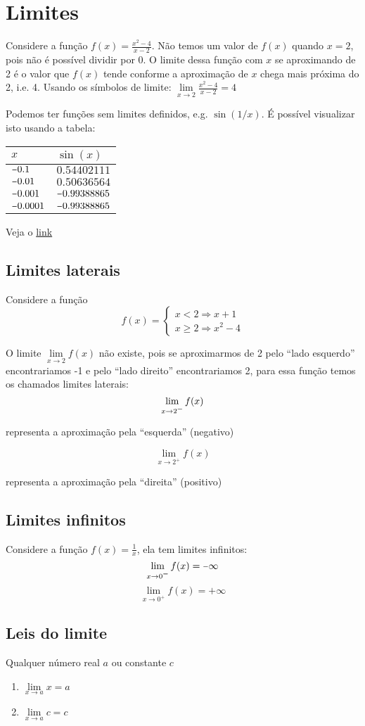 \documentclass[12pt,a4paper]{article}
\newcommand{\minus}{\scalebox{0.75}[1.0]{$-$}}
\begin{document}
\section*{Limites}
Considere a função $f(x) = \frac{x^2 - 4}{x-2}$.
Não temos um valor de $f(x)$ quando $x=2$, pois não é possível dividir por 0.
O limite dessa função com $x$ se aproximando de 2 é o valor que $f(x)$ tende conforme
a aproximação de $x$ chega mais próxima do 2, i.e. 4.
Usando os símbolos de limite: $\lim\limits_{x \to 2} \frac{x^2 - 4}{x-2} = 4$

Podemos ter funções sem limites definidos, e.g. $\sin(1/x)$. É possível visualizar isto usando a tabela:
\begin{center}
	\begin{tabular}{l|l}
		$x$       & $\sin(x)$     \\ \hline
		$\minus0.1$    & $0.54402111$  \\
		$\minus0.01$   & $0.50636564$  \\
		$\minus0.001$  & $\minus0.99388865$ \\
		$\minus0.0001$ & $\minus0.99388865$ 
	\end{tabular}
\end{center}
Veja o \href{https://www.mathway.com/pt/popular-problems/Calculus/501510}{link}

\subsection*{Limites laterais}
Considere a função \[f(x) =
	\begin{cases}
		x < 2 \Rightarrow x + 1 \\
		x \ge 2 \Rightarrow x^2 - 4
	\end{cases}
\]

O limite $\lim\limits_{x \to 2} f(x)$ não existe, pois se aproximarmos de 2 pelo ``lado esquerdo'' encontrariamos -1
e pelo ``lado direito'' encontrariamos 2, para essa função temos os chamados limites laterais:
\[\lim\limits_{x \to 2^{\minus}} f(x)\]
\begin{center}
	representa a aproximação pela ``esquerda'' (negativo)
\end{center}
\[\lim\limits_{x \to 2^{+}} f(x)\]
\begin{center}
	representa a aproximação pela ``direita'' (positivo)
\end{center}

\subsection*{Limites infinitos}
Considere a função $f(x) = \frac{1}{x}$, ela tem limites infinitos:
\[\lim\limits_{x \to 0^{\minus}} f(x) = \minus\infty\]
\[\lim\limits_{x \to 0^{+}} f(x) = +\infty\]

\subsection*{Leis do limite}
Qualquer número real $a$ ou constante $c$
\begin{center}
	\begin{enumerate}
		\item $\lim\limits_{x \to a} x = a$
		\item $\lim\limits_{x \to a} c = c$
	\end{enumerate}
\end{center}
\end{document}
